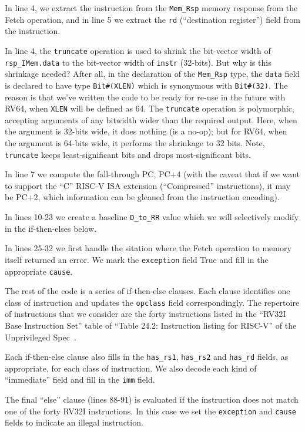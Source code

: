 In line 4, we extract the instruction from the \verb|Mem_Rsp| memory
response from the Fetch operation, and in line 5 we extract the
\verb|rd| (``destination register'') field from the instruction.


In line 4, the \verb|truncate| operation is used to shrink the
bit-vector width of \verb|rsp_IMem.data| to the bit-vector width of
\verb|instr| (32-bits).  But why is this shrinkage needed?  After all,
in the declaration of the \verb|Mem_Rsp| type, the \verb|data| field
is declared to have type \verb|Bit#(XLEN)| which is synonymous with
\verb|Bit#(32)|.  The reason is that we've written the code to be
ready for re-use in the future with RV64, when \verb|XLEN| will be
defined as 64.  The \verb|truncate| operation is polymorphic,
accepting arguments of any bitwidth wider than the required output.
Here, when the argument is 32-bits wide, it does nothing (is a no-op);
but for RV64, when the argument is 64-bits wide, it performs the
shrinkage to 32 bits.  Note, \verb|truncate| keeps least-significant
bits and drops most-significant bits.

In line 7 we compute the fall-through PC, PC+4 (with the caveat that
if we want to support the ``C'' RISC-V ISA extension (``Compressed''
instructions), it may be PC+2, which information can be gleaned from
the instruction encoding).

In lines 10-23 we create a baseline \verb|D_to_RR| value which we will
selectively modify in the if-then-elses below.

In lines 25-32 we first handle the sitation where the Fetch operation
to memory itself returned an error.  We mark the \verb|exception|
field True and fill in the appropriate \verb|cause|.

The rest of the code is a series of if-then-else clauses. Each clause
identifies one class of instruction and updates the \verb|opclass|
field correspondingly.  The repertoire of instructions that we
consider are the forty instructions listed in the ``RV32I Base
Instruction Set'' table of ``Table 24.2: Instruction listing for
RISC-V'' of the Unprivileged Spec~\cite{RISCV_Unpriv_2019_12_13}.

Each if-then-else clause also fills in the \verb|has_rs1|,
\verb|has_rs2| and \verb|has_rd| fields, as appropriate, for each
class of instruction.  We also decode each kind of ``immediate'' field
and fill in the \verb|imm| field.

The final ``else'' clause (lines 88-91) is evaluated if the
instruction does not match one of the forty RV32I instructions.  In
this case we set the \verb|exception| and \verb|cause| fields to
indicate an illegal instruction.

